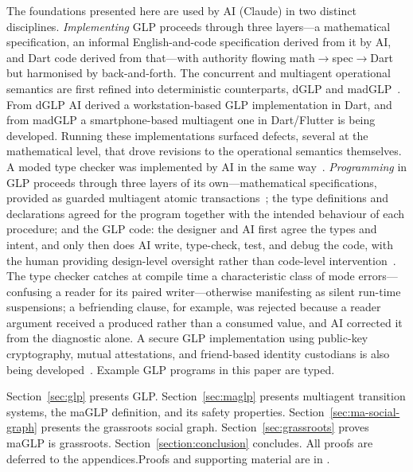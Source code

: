  The foundations presented here are used by AI (Claude) in two distinct disciplines. \emph{Implementing} GLP proceeds through three layers---a mathematical specification, an informal English-and-code specification derived from it by AI, and Dart code derived from that---with authority flowing math$\to$spec$\to$Dart but harmonised by back-and-forth. The concurrent and multiagent operational semantics are first refined into deterministic counterparts, dGLP and madGLP~\cite{shapiro2026implementing}. From dGLP AI derived a workstation-based GLP implementation in Dart, and from madGLP a smartphone-based multiagent one in Dart/Flutter is being developed. Running these implementations surfaced defects, several at the mathematical level, that drove revisions to the operational semantics themselves. A moded type checker was implemented by AI in the same way~\cite{shapiro2026types}. \emph{Programming} in GLP proceeds through three layers of its own---mathematical specifications, provided as guarded multiagent atomic transactions~\cite{lewis2026volitional}; the type definitions and declarations agreed for the program together with the intended behaviour of each procedure; and the GLP code: the designer and AI first agree the types and intent, and only then does AI write, type-check, test, and debug the code, with the human providing design-level oversight rather than code-level intervention~\cite{shapiro2026types}. The type checker catches at compile time a characteristic class of mode errors---confusing a reader for its paired writer---otherwise manifesting as silent run-time suspensions; a befriending clause, for example, was rejected because a reader argument received a produced rather than a consumed value, and AI corrected it from the diagnostic alone. A secure GLP implementation using public-key cryptography, mutual attestations, and friend-based identity custodians is also being developed~\cite{eitan2026securing}. Example GLP programs in this paper are typed.

Section~\ref{sec:glp} presents GLP. Section~\ref{sec:maglp} presents multiagent transition systems, the maGLP definition, and its safety properties. Section~\ref{sec:ma-social-graph} presents the grassroots social graph. Section~\ref{sec:grassroots} proves maGLP is grassroots. Section~\ref{section:conclusion} concludes. \ifappendix All proofs are deferred to the appendices.\else Proofs and supporting material are in  \arxivref.\fi
